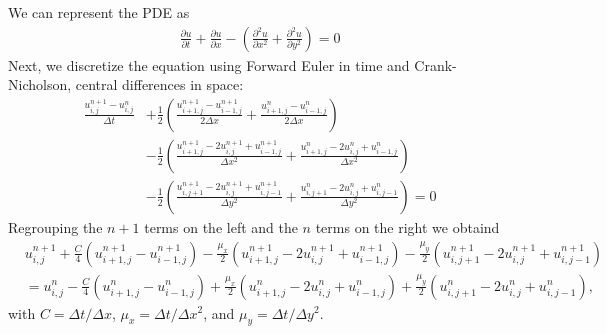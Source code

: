 \begin{questions}
\begin{solution}
We can represent the PDE as
\begin{align*}
\frac{\partial u}{\partial t} + \frac{\partial u}{\partial x} - \left(\frac{\partial^2 u}{\partial x^2} + \frac{\partial^2 u}{\partial y^2}\right) =0
\end{align*}
Next, we discretize the equation using Forward Euler in time and Crank-Nicholson, central differences in space:
\begin{align*}
\frac{u_{i,j}^{n+1}-u_{i,j}^{n}}{\Delta t} &+ \frac{1}{2}\left( \frac{u_{i+1,j}^{n+1}-u_{i-1,j}^{n+1}}{2\Delta x} + \frac{u_{i+1,j}^{n}-u_{i-1,j}^{n}}{2\Delta x} \right) \\
&- \frac{1}{2}\left( \frac{u_{i+1,j}^{n+1}-2u_{i,j}^{n+1}+u_{i-1,j}^{n+1}}{\Delta x^2} + \frac{u_{i+1,j}^{n}-2u_{i,j}^{n}+u_{i-1,j}^{n}}{\Delta x^2} \right)\\
&- \frac{1}{2}\left( \frac{u_{i,j+1}^{n+1}-2u_{i,j}^{n+1}+u_{i,j-1}^{n+1}}{\Delta y^2} + \frac{u_{i,j+1}^{n}-2u_{i,j}^{n}+u_{i,j-1}^{n}}{\Delta y^2} \right) = 0
\end{align*}
Regrouping the $n+1$ terms on the left and the $n$ terms on the right we obtaind
\begin{align*}
&u_{i,j}^{n+1} + \frac{C}{4}\left( u_{i+1,j}^{n+1} - u_{i-1,j}^{n+1} \right) - \frac{\mu_x}{2}\left( u_{i+1,j}^{n+1} -2u_{i,j}^{n+1} + u_{i-1,j}^{n+1} \right) - \frac{\mu_y}{2}\left( u_{i,j+1}^{n+1} -2u_{i,j}^{n+1} + u_{i,j-1}^{n+1} \right) \\
& = u_{i,j}^{n} - \frac{C}{4}\left( u_{i+1,j}^{n} - u_{i-1,j}^{n} \right) + \frac{\mu_x}{2}\left( u_{i+1,j}^{n} -2u_{i,j}^{n} + u_{i-1,j}^{n} \right) + \frac{\mu_y}{2}\left( u_{i,j+1}^{n} -2u_{i,j}^{n} + u_{i,j-1}^{n} \right),
\end{align*}
with $C = \Delta t/\Delta x$, $\mu_x = \Delta t/\Delta x^2$, and $\mu_y = \Delta t/\Delta y^2$. 


\end{solution}
\end{questions}
